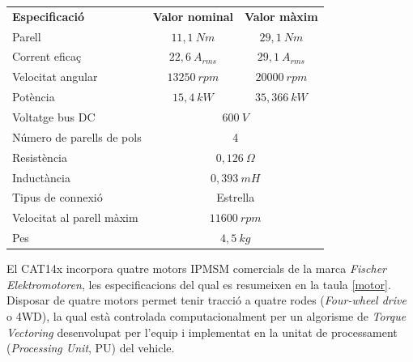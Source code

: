 {{\begin{table}[!htb]
            \begin{tabular}{|l|c|c|}
                \hline
                    \textbf{ Especificació } & 
                    \textbf{ Valor nominal } &
                    \textbf{ Valor màxim } \\
                \hhline{|=|=|=|}
                    { Parell } & 
                    { $11,1\ Nm$ } & 
                    { $29,1\ Nm$ } \\
                \hline
                    { Corrent eficaç } & 
                    { $22,6\ A_{rms}$ } & 
                    { $29,1\ A_{rms}$ } \\
                \hline
                    { Velocitat angular } & 
                    { $13250\ rpm$ } & 
                    { $20000\ rpm$ } \\
                \hline
                    { Potència } & 
                    { $15,4\ kW$ } & 
                    { $35,366\ kW$ } \\
                \hhline{|=|=|=|}
                    { Voltatge bus DC } & 
                    \multicolumn{2}{|c|}{ $600\ V$ } \\
                \hline
                    { Número de parells de pols } & 
                    \multicolumn{2}{|c|}{ 4 } \\
                \hline
                    { Resistència } & 
                    \multicolumn{2}{|c|}{ $0,126\ \Omega$ } \\
                \hline
                    { Inductància } & 
                    \multicolumn{2}{|c|}{ $0,393\ mH$ } \\
                \hline
                    { Tipus de connexió } & 
                    \multicolumn{2}{|c|}{ Estrella } \\
                \hline
                    { Velocitat al parell màxim } & 
                    \multicolumn{2}{|c|}{ $11600\ rpm$ } \\
                \hline
                    { Pes } & 
                    \multicolumn{2}{|c|}{ $4,5\ kg$ } \\
                \hline
            \end{tabular}
        \end{table}

        El CAT14x incorpora quatre motors IPMSM comercials de la marca
        \emph{Fischer Elektromotoren}, les especificacions del qual es
        resumeixen en la taula \ref{motor}. Disposar de quatre motors permet
        tenir tracció a quatre rodes (\emph{Four-wheel drive} o 4WD), la qual
        està controlada computacionalment per un algorisme de \emph{Torque
        Vectoring} desenvolupat per l'equip i implementat en la unitat de
        processament (\emph{Processing Unit}, PU) del vehicle.

}}
